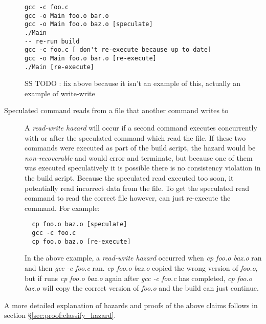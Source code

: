 \begin{description}
\begin{verbatim}
gcc -c foo.c
gcc -o Main foo.o bar.o
gcc -o Main foo.o baz.o [speculate]
./Main
-- re-run build
gcc -c foo.c [ don't re-execute because up to date]
gcc -o Main foo.o bar.o [re-execute]
./Main [re-execute]
\end{verbatim}

SS TODO : fix above because it isn't an example of this, actually an example of write-write


\item [Speculated command reads from a file that another command writes to]
    A \emph{read-write hazard} will occur if a second command executes concurrently with or after the speculated command which read the file.  If these two commands were executed as part of the build script, the hazard would be \emph{non-recoverable} and \Rattle would error and terminate, but because one of them was executed speculatively it is possible there is no consistency violation in the build script.  Because the speculated read executed too soon, it potentially read incorrect data from the file.  To get the speculated read command to read the correct file however, \Rattle can just re-execute the command. For example:

\begin{verbatim}
  cp foo.o baz.o [speculate]
  gcc -c foo.c
  cp foo.o baz.o [re-execute]
\end{verbatim}

In the above example, a \emph{read-write hazard} occurred when \emph{cp foo.o baz.o} ran and then \emph{gcc -c foo.c} ran.  \emph{cp foo.o baz.o} copied the wrong version of \emph{foo.o}, but if \Rattle
runs \emph{cp foo.o baz.o} again after \emph{gcc -c foo.c} has completed, \emph{cp foo.o baz.o} will copy the correct version of \emph{foo.o} and the build can just continue.
\end{description}

A more detailed explanation of hazards and proofs of the above claims follows in section \S\ref{sec:proof:classify_hazard}.

